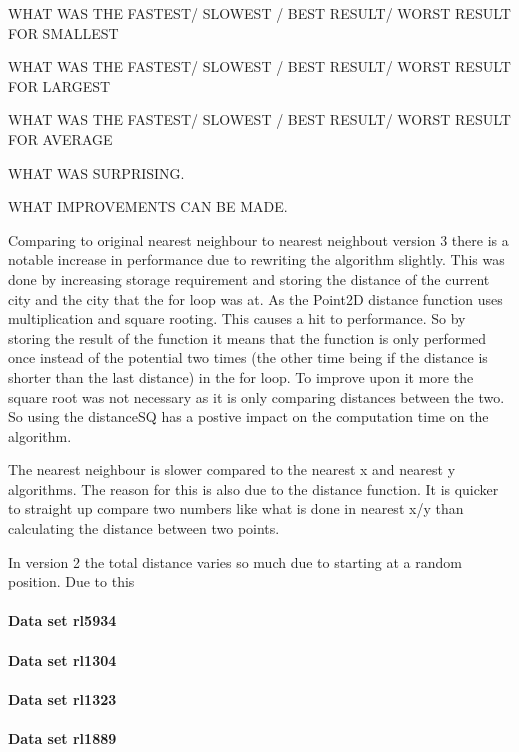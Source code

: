 \documentclass[conference,backref=page]{acmsiggraph}
\begin{document}
 WHAT WAS THE FASTEST/ SLOWEST / BEST RESULT/ WORST RESULT FOR SMALLEST 
 
 
 WHAT WAS THE FASTEST/ SLOWEST / BEST RESULT/ WORST RESULT FOR LARGEST
 
 
 WHAT WAS THE FASTEST/ SLOWEST / BEST RESULT/ WORST RESULT FOR AVERAGE
 
 WHAT WAS SURPRISING.
 
 WHAT IMPROVEMENTS CAN BE MADE.
  
  Comparing to original nearest neighbour to nearest neighbout version 3 there is a notable increase in performance due to rewriting the algorithm slightly. This was done by increasing storage requirement and storing the distance of the current city and the city that the for loop was at. As the Point2D distance function uses multiplication and square rooting. This causes a hit to performance. So by storing the result of the function it means that the function is only performed once instead of the potential two times (the other time being if the distance is shorter than the last distance) in the for loop. To improve upon it more the square root was not necessary as it is only comparing distances between the two. So using the distanceSQ has a postive impact on the computation time on the algorithm.
  
  The nearest neighbour is slower compared to the nearest x and nearest y algorithms. The reason for this is also due to the distance function. It is quicker to straight up compare two numbers like what is done in nearest x/y than calculating the distance between two points.
  
  In version 2 the total distance varies so much due to starting at a random position. Due to this 


\paragraph{Data set rl5934}

\paragraph{Data set rl1304}


\paragraph{Data set rl1323}


\paragraph{Data set rl1889}
\end{document}
